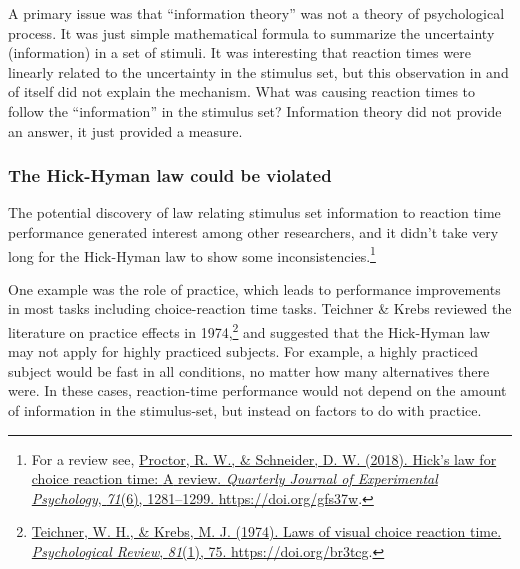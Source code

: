 \documentclass[
  oneside,
  12pt]{crumpbook}
\begin{document}
A primary issue was that ``information theory'' was not a theory of psychological process. It was just simple mathematical formula to summarize the uncertainty (information) in a set of stimuli. It was interesting that reaction times were linearly related to the uncertainty in the stimulus set, but this observation in and of itself did not explain the mechanism. What was causing reaction times to follow the ``information'' in the stimulus set? Information theory did not provide an answer, it just provided a measure.

\hypertarget{the-hick-hyman-law-could-be-violated}{%
\subsubsection{The Hick-Hyman law could be violated}\label{the-hick-hyman-law-could-be-violated}}

The potential discovery of law relating stimulus set information to reaction time performance generated interest among other researchers, and it didn't take very long for the Hick-Hyman law to show some inconsistencies.\footnote{For a review see, \protect\hyperlink{ref-proctorHickLawChoice2018}{Proctor, R. W., \& Schneider, D. W. (2018). Hick's law for choice reaction time: {A} review. \emph{Quarterly Journal of Experimental Psychology}, \emph{71}(6), 1281--1299. \url{https://doi.org/gfs37w}}.}

One example was the role of practice, which leads to performance improvements in most tasks including choice-reaction time tasks. Teichner \& Krebs reviewed the literature on practice effects in 1974,\footnote{\protect\hyperlink{ref-teichnerLawsVisualChoice1974}{Teichner, W. H., \& Krebs, M. J. (1974). Laws of visual choice reaction time. \emph{Psychological Review}, \emph{81}(1), 75. \url{https://doi.org/br3tcg}}.} and suggested that the Hick-Hyman law may not apply for highly practiced subjects. For example, a highly practiced subject would be fast in all conditions, no matter how many alternatives there were. In these cases, reaction-time performance would not depend on the amount of information in the stimulus-set, but instead on factors to do with practice.
\end{document}
